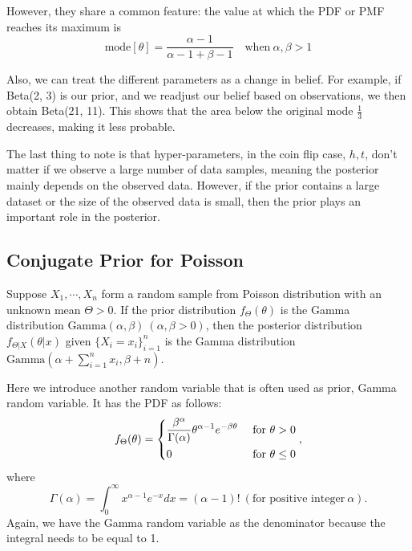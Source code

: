 However, they share a common feature: the value at which the PDF or PMF reaches its maximum is 
\[
  \text{mode}[\theta] = \dfrac{\alpha - 1}{\alpha - 1 + \beta - 1} \quad \text{when}\ \alpha, \beta > 1
\] 

Also, we can treat the different parameters as a change in belief. For example, if Beta(2, 3) is our prior, and we readjust our belief based on observations, we then obtain Beta(21, 11). This shows that the area below the original mode \(\frac{1}{3}\) decreases, making it less probable. 

The last thing to note is that hyper-parameters, in the coin flip case, \(h, t\), don’t matter if we observe a large number of data samples, meaning the posterior mainly depends on the observed data. However, if the prior contains a large dataset or the size of the observed data is small, then the prior plays an important role in the posterior. 

\subsection{Conjugate Prior for Poisson}
\begin{definition}
  Suppose \(X_1, \cdots, X_n\) form a random sample from Poisson distribution with an unknown mean \(\Theta > 0\). If the prior distribution \(f_{\Theta}(\theta)\) is the Gamma distribution \(\text{Gamma}(\alpha, \beta)\ (\alpha, \beta >0)\), then the posterior distribution \(f_{\Theta \vert X} (\theta \vert x)\) given \(\{X_i = x_i\}_{i=1} ^n\) is the Gamma distribution \(\text{Gamma}(\alpha + \sum_{i = 1}^n x_i, \beta + n)\). 
\end{definition}

Here we introduce another random variable that is often used as prior, Gamma random variable. It has the PDF as follows: 
\[
  f_{\Theta} (\theta) = \begin{dcases}
    \dfrac{\beta^{\alpha}}{\Gamma (\alpha)}\theta^{\alpha - 1} e^{-\beta\theta} &\text{ for } \theta > 0 \\
    0 &\text{ for } \theta \leq 0 \\
  \end{dcases}, 
\]
where 
\[
  \Gamma (\alpha) = \int_{0}^{\infty} x^{\alpha - 1} e^{-x} dx = (\alpha - 1)!\ (\text{for positive integer}\ \alpha).
\]
Again, we have the Gamma random variable as the denominator because the integral needs to be equal to 1.

